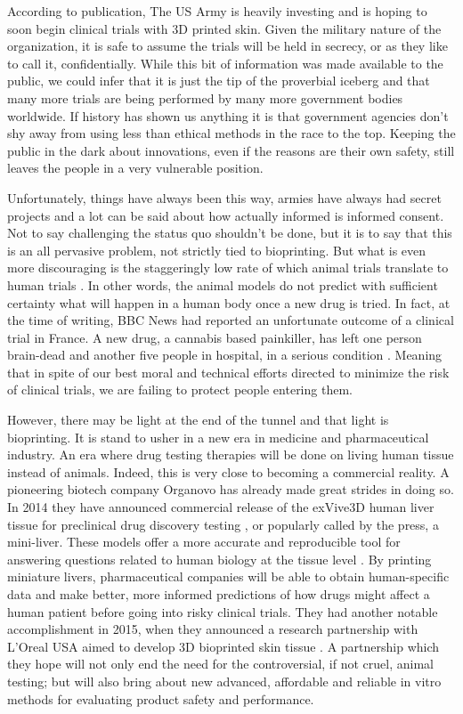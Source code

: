 \documentclass[12pt]{article} %
\begin{document}
According to \cite{Army Technology:2014} publication, The US Army is heavily investing and is hoping to soon begin clinical trials with 3D printed skin. Given the military nature of the organization, it is safe to assume the trials will be held in secrecy, or as they like to call it, confidentially. While this bit of information was made available to the public, we could infer that it is just the tip of the proverbial iceberg and that many more trials are being performed by many more government bodies worldwide. If history has shown us anything it is that government agencies don't shy away from using less than ethical methods in the race to the top. Keeping the public in the dark about innovations, even if the reasons are their own safety, still leaves the people in a very vulnerable position.

Unfortunately, things have always been this way, armies have always had secret projects and a lot can be said about how actually informed is informed consent. Not to say challenging the status quo shouldn't be done, but it is to say that this is an all pervasive problem, not strictly tied to bioprinting. But what is even more discouraging is the staggeringly low rate of which animal trials translate to human trials \cite{Worp:2010}. In other words, the animal models do not predict with sufficient certainty what will happen in a human body once a new drug is tried. In fact, at the time of writing, BBC News had reported an unfortunate outcome of a clinical trial in France. A new drug, a cannabis based painkiller, has left one person brain-dead and another five people in hospital, in a serious condition \cite{BBC News:2016}. Meaning that in spite of our best moral and technical efforts directed to minimize the risk of clinical trials, we are failing to protect people entering them.

However, there may be light at the end of the tunnel and that light is bioprinting. It is stand to usher in a new era in medicine and pharmaceutical industry. An era where drug testing therapies will be done on living human tissue instead of animals. Indeed, this is very close to becoming a commercial reality. A pioneering biotech company Organovo has already made great strides in doing so. In 2014 they have announced commercial release of the exVive3D human liver tissue for preclinical drug discovery testing \cite{Organovo:2014}, or popularly called by the press, a mini-liver. These models offer a more accurate and reproducible tool for answering questions related to human biology at the tissue level \cite{Visk:2015}. By printing miniature livers, pharmaceutical companies will be able to obtain human-specific data and make better, more informed predictions of how drugs might affect a human patient before going into risky clinical trials. They had another notable accomplishment in 2015, when they announced a research partnership with  L'Oreal USA aimed to develop 3D bioprinted skin tissue \cite{Organovo:2015}. A partnership which they hope will not only end the need for the controversial, if not cruel, animal testing; but will also bring about new advanced, affordable and reliable in vitro methods for evaluating product safety and performance.
\end{document}
